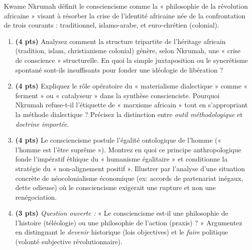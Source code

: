 \documentclass[11pt]{article}
\begin{document}
\begin{exercice}
Kwame Nkrumah définit le consciencisme comme la « philosophie de la révolution africaine » visant à résorber la crise de l'identité africaine née de la confrontation de trois courants : traditionnel, islamo-arabe, et euro-chrétien (colonial).
\begin{enumerate}
    \item \textbf{(4 pts)} Analysez comment la structure tripartite de l'héritage africain (tradition, islam, christianisme colonial) génère, selon Nkrumah, une « crise de conscience » structurelle. En quoi la simple juxtaposition ou le syncrétisme spontané sont-ils insuffisants pour fonder une idéologie de libération ?
    \item \textbf{(4 pts)} Expliquez le rôle opératoire du « materialisme dialectique » comme « ferment » ou « catalyseur » dans la synthèse conscienciste. Pourquoi Nkrumah refuse-t-il l'étiquette de « marxisme africain » tout en s'appropriant la méthode dialectique ? Précisez la distinction entre \textit{outil méthodologique} et \textit{doctrine importée}.
    \item \textbf{(4 pts)} Le consciencisme postule l'égalité ontologique de l'homme (« l'homme est l'être suprême »). Montrez en quoi ce principe anthropologique fonde l'impératif éthique du « humanisme égalitaire » et conditionne la stratégie du « non-alignement positif ». Illustrer par l'analyse d'une situation concrète de néocolonialisme économique (ex: accords de partenariat inégaux, dette odieuse) où le consciencisme exigerait une rupture et non une renégociation.
    \item \textbf{(3 pts)} \textit{Question ouverte :} « Le consciencisme est-il une philosophie de l'histoire (téléologie) ou une philosophie de l'action (praxis) ? » Argumentez en distinguant le \textit{devenir} historique (lois objectives) et le \textit{faire} politique (volonté subjective révolutionnaire).
\end{enumerate}
\end{exercice}
\end{document}
